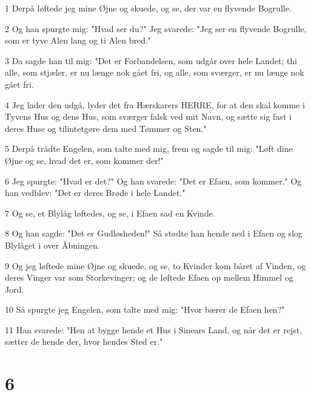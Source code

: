 \par 1 Derpå løftede jeg mine Øjne og skuede, og se, der var en flyvende Bogrulle.
\par 2 Og han spurgte mig: "Hvad ser du?" Jeg svarede: "Jeg ser en flyvende Bogrulle, som er tyve Alen lang og ti Alen bred."
\par 3 Da sagde han til mig: "Det er Forbandelsen, som udgår over hele Landet; thi alle, som stjæler, er nu længe nok gået fri, og alle, som sværger, er nu længe nok gået fri.
\par 4 Jeg lader den udgå, lyder det fra Hærskarers HERRE, for at den skal komme i Tyvens Hus og dens Hus, som sværger falsk ved mit Navn, og sætte sig fast i deres Huse og tilintetgøre dem med Tømmer og Sten."
\par 5 Derpå trådte Engelen, som talte med mig, frem og sagde til mig: "Løft dine Øjne og se, hvad det er, som kommer der!"
\par 6 Jeg spurgte: "Hvad er det?" Og han svarede: "Det er Efaen, som kommer." Og han vedblev: "Det er deres Brøde i hele Landet."
\par 7 Og se, et Blylåg løftedes, og se, i Efaen sad en Kvinde.
\par 8 Og han sagde: "Det er Gudløsheden!" Så stødte han hende ned i Efaen og slog Blylåget i over Åbningen.
\par 9 Og jeg løftede mine Øjne og skuede, og se, to Kvinder kom båret af Vinden, og deres Vinger var som Storkevinger; og de løftede Efaen op mellem Himmel og Jord.
\par 10 Så spurgte jeg Engelen, som talte med mig: "Hvor bærer de Efaen hen?"
\par 11 Han svarede: "Hen at bygge hende et Hus i Sinears Land, og når det er rejst, sætter de hende der, hvor hendes Sted er."

\chapter{6}


